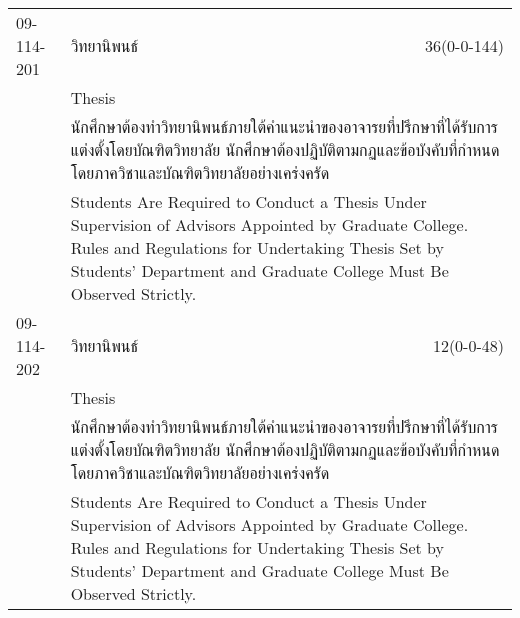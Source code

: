 \begin{longtable}{p{}p{}r{}}
09-114-201 & วิทยานิพนธ์ & 36(0-0-144)\\*
 & Thesis & \phantom{x} \vspace{3mm} \\*
&  \multicolumn{2}{p{0.75\textwidth}}{นักศึกษาต้องทำวิทยานิพนธ์ภายใต้คำแนะนำของอาจารยที่ปรึกษาที่ได้รับการแต่งตั้งโดยบัณฑิตวิทยาลัย นักศึกษาต้องปฏิบัติตามกฏและข้อบังคับที่กำหนดโดยภาควิชาและบัณฑิตวิทยาลัยอย่างเคร่งครัด} \vspace{3mm} \\*
&  \multicolumn{2}{p{0.75\textwidth}}{Students Are Required to Conduct a Thesis Under Supervision of Advisors Appointed by Graduate College. Rules and Regulations for Undertaking Thesis Set by Students’ Department and Graduate College Must Be Observed Strictly.} \vspace{8mm} \\*
09-114-202 & วิทยานิพนธ์ & 12(0-0-48)\\*
 & Thesis & \phantom{x} \vspace{3mm} \\*
&  \multicolumn{2}{p{0.75\textwidth}}{นักศึกษาต้องทำวิทยานิพนธ์ภายใต้คำแนะนำของอาจารยที่ปรึกษาที่ได้รับการแต่งตั้งโดยบัณฑิตวิทยาลัย นักศึกษาต้องปฏิบัติตามกฏและข้อบังคับที่กำหนดโดยภาควิชาและบัณฑิตวิทยาลัยอย่างเคร่งครัด} \vspace{3mm} \\*
&  \multicolumn{2}{p{0.75\textwidth}}{Students Are Required to Conduct a Thesis Under Supervision of Advisors Appointed by Graduate College. Rules and Regulations for Undertaking Thesis Set by Students’ Department and Graduate College Must Be Observed Strictly.} \vspace{8mm} \\*
\end{longtable}

